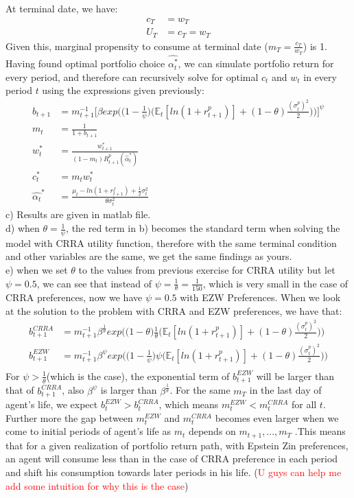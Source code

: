 \documentclass[12pt,a4paper]{article}
\begin{document}
At terminal date, we have: 
\begin{align*}
    c_T&=w_T\\
    U_T&=c_T=w_T
\end{align*}
Given this, marginal propensity to consume at terminal date  \big($m_T=\frac{c_T}{w_T}$\big)  is 1. Having found optimal portfolio choice $ \hat{\alpha_t^*}$, we can simulate portfolio return for every period, and therefore can recursively solve for optimal $c_t$ and $w_t$ in every period $t$ using the expressions given previously: 
\begin{align*}
    b_{t+1}&=m_{t+1}^{-1}\bigg[\beta  exp\bigg(\bigg(1-\frac{1}{\psi}\bigg)\bigg(\mathbb{E}_t[ln(1+r^p_{t+1})]+(1-\theta)\frac{(\sigma_t^p)^2}{2}\bigg)\bigg)\bigg]^{\psi}\\
    m_{t}&=\frac{1}{1+b_{t+1}}\\
    w_t^*&=\frac{w_{t+1}^*}{(1-m_t)R_{t+1}^p(\hat{\alpha}_t^*)}\\
    c_t^*&=m_tw_t^*\\
    \hat{\alpha_t}^{*}&=\frac{\mu_t-ln(1+r^f_{t+1})+\frac{1}{2}\sigma_t^2}{\theta\sigma_t^2} 
\end{align*}
c) Results are given in matlab file.\\

d) when $\theta=\frac{1}{\psi}$, the red term in b) becomes the standard term when solving the model with CRRA utility function, therefore with the same terminal condition and other variables are the same, we get the same findings as yours.\\

e) when we set $\theta$ to the values from previous exercise for CRRA utility but let $\psi=0.5$, we can see that instead of $\psi=\frac{1}{\theta}=\frac{1}{150}$, which is very small in the case of CRRA preferences, now we have $\psi=0.5$ with EZW Preferences. When we look at the solution to the problem with CRRA and EZW preferences, we have that:
\begin{align*}
    b_{t+1}^{CRRA}&=m_{t+1}^{-1}\beta^{\frac{1}{\theta}}  exp\bigg(\bigg  (1-\theta\bigg)\frac{1}{\theta}\bigg(\mathbb{E}_t[ln(1+r^p_{t+1})]+(1-\theta)\frac{(\sigma_t^p)^2}{2}\bigg)\bigg)\\
     b_{t+1}^{EZW}&=m_{t+1}^{-1}\beta^\psi exp\bigg(\bigg(1-\frac{1}{\psi}\bigg)\psi\bigg(\mathbb{E}_t[ln(1+r^p_{t+1})]+(1-\theta)\frac{(\sigma_t^p)^2}{2}\bigg)\bigg)\\
\end{align*}
For $\psi>\frac{1}{\theta}$(which is the case), the exponential term of $b_{t+1}^{EZW}$ will be larger than that of $b_{t+1}^{CRRA}$, also $\beta^\psi$ is larger than $\beta^\frac{1}{\theta}$. For the same $m_T$ in the last day of agent's life, we expect $b_t^{EZW}>b_t^{CRRA}$, which means $m_t^{EZW}<m_t^{CRRA}$ for all $t$. Further more the gap between $m_t^{EZW}$ and $m_t^{CRRA}$ becomes even larger when we come to initial periods of agent's life as $m_t$ depends on $m_{t+1},...,m_T$
.This means that for a given realization of portfolio return path, with Epstein Zin preferences, an agent will consume less than in the case of CRRA preference in each period and shift his consumption towards later periods in his life. (\textcolor{red}{U guys can help me add some intuition for why this is the case}) \\
\end{document}
